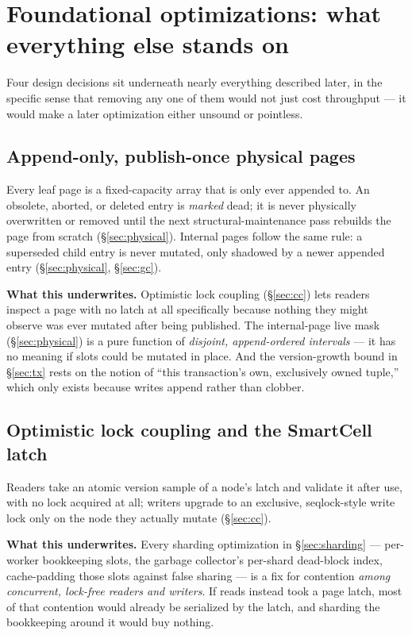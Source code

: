 \documentclass[11pt]{article}
\begin{document}
\section{Foundational optimizations: what everything else stands on}
\label{sec:foundational}

Four design decisions sit underneath nearly everything described later, in the
specific sense that removing any one of them would not just cost throughput --- it
would make a later optimization either unsound or pointless.

\subsection{Append-only, publish-once physical pages}

Every leaf page is a fixed-capacity array that is only ever appended to. An
obsolete, aborted, or deleted entry is \emph{marked} dead; it is never physically
overwritten or removed until the next structural-maintenance pass rebuilds the page
from scratch (\S\ref{sec:physical}). Internal pages follow the same rule: a
superseded child entry is never mutated, only shadowed by a newer appended entry
(\S\ref{sec:physical}, \S\ref{sec:gc}).

\textbf{What this underwrites.} Optimistic lock coupling (\S\ref{sec:cc}) lets
readers inspect a page with no latch at all specifically because nothing they might
observe was ever mutated after being published. The internal-page live mask
(\S\ref{sec:physical}) is a pure function of \emph{disjoint, append-ordered
intervals} --- it has no meaning if slots could be mutated in place. And the
version-growth bound in \S\ref{sec:tx} rests on the notion of ``this transaction's
own, exclusively owned tuple,'' which only exists because writes append rather than
clobber.

\subsection{Optimistic lock coupling and the SmartCell latch}

Readers take an atomic version sample of a node's latch and validate it after use,
with no lock acquired at all; writers upgrade to an exclusive, seqlock-style write
lock only on the node they actually mutate (\S\ref{sec:cc}).

\textbf{What this underwrites.} Every sharding optimization in \S\ref{sec:sharding}
--- per-worker bookkeeping slots, the garbage collector's per-shard dead-block
index, cache-padding those slots against false sharing --- is a fix for contention
\emph{among concurrent, lock-free readers and writers}. If reads instead took a page
latch, most of that contention would already be serialized by the latch, and
sharding the bookkeeping around it would buy nothing.
\end{document}
